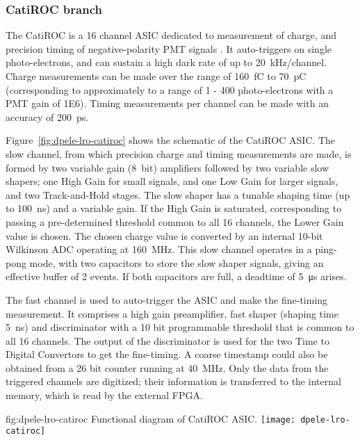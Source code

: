 \subsubsection{CatiROC branch} %

The CatiROC is a \num{16} channel ASIC dedicated to measurement of charge, and precision timing of negative-polarity PMT signals \cite{Blin:2017}. It auto-triggers on single photo-electrons, and can sustain a high dark rate of up to \SI{20} {kHz/channel}. Charge measurements can be made over the range of \SI{160}{fC} to \SI{70}{pC} (corresponding to approximately to a range of \num{1} - \num{400} photo-electrons with a PMT gain of \num{1E6}). Timing measurements per channel can be made with an accuracy of \SI{200}{ps}.

Figure~\ref{fig:dpele-lro-catiroc} shows the schematic of the CatiROC ASIC. The slow channel, from which precision charge and timing measurements are made, is formed by two variable gain (\SI{8}{bit}) amplifiers followed by two variable slow shapers; one High Gain for small signals, and one Low Gain for larger signals, and two Track-and-Hold stages. The slow shaper has a tunable shaping time (up to \SI{100}{ns}) and a variable gain.  If the High Gain is saturated, corresponding to passing a pre-determined threshold common to all 16 channels, the Lower Gain value is chosen. The chosen charge value is converted by an internal 10-bit Wilkinson ADC operating at \SI{160}{MHz}.  This slow channel operates in a ping-pong mode, with two capacitors to store the slow shaper signals, giving an effective buffer of 2 events. If both capacitors are full, a deadtime of \SI{5}{\micro\second} arises.

The fast channel is used to auto-trigger the ASIC and make the fine-timing measurement. It comprises a high gain preamplifier, fast shaper (shaping time \SI{5}{ns}) and discriminator with a \num{10} bit programmable threshold that is common to all \num{16} channels. The output of the discriminator is used for the two Time to Digital Convertors to get the fine-timing. A coarse timestamp could also be obtained from a \num{26} bit counter running at \SI{40}{MHz}.  Only the data from the triggered channels are digitized; their information is transferred to the internal memory, which is read by the external FPGA. 

\begin{dunefigure}{fig:dpele-lro-catiroc}
{Functional diagram of CatiROC ASIC.}
\texttt{[image: dpele-lro-catiroc]}
\end{dunefigure}

